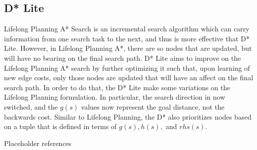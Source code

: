 	\subsection{D* Lite}
	Lifelong Planning A* Search is an incremental search algorithm which can carry information from one search task to the next, and thus is more effective that D* Lite. However, in Lifelong Planning A*, there are so nodes that are updated, but will have no bearing on the final search path. D* Lite aims to improve on the Lifelong Planning A* search by further optimizing it such that, upon learning of new edge costs, only those nodes are updated that will have an affect on the final search path. In order to do that, the D* Lite make some variations on the Lifelong Planning formulation. In particular, the search direction in now switched, and the $g(s)$ values now represent the goal distance, not the backwards cost. Similar to Lifelong Planning, the D* also prioritizes nodes based on a tuple that is defined in terms of  $g(s),h(s),$ and $rhs(s)$. 	


Placeholder references
\cite{koenig2002d}\cite{koenig2002improved}\cite{koenig2004lifelong}\cite{simmons1995probabilistic}